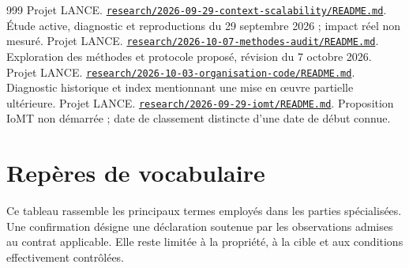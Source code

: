 \documentclass[11pt,a4paper]{article}
\newcommand{\source}[2]{\href{../../#1}{\nolinkurl{#1}}. #2}
\begin{document}
\begin{thebibliography}{999}
 Projet LANCE. \source{research/2026-09-29-context-scalability/README.md}{Étude active, diagnostic et reproductions du 29 septembre 2026 ; impact réel non mesuré.}
 Projet LANCE. \source{research/2026-10-07-methodes-audit/README.md}{Exploration des méthodes et protocole proposé, révision du 7 octobre 2026.}
 Projet LANCE. \source{research/2026-10-03-organisation-code/README.md}{Diagnostic historique et index mentionnant une mise en œuvre partielle ultérieure.}
 Projet LANCE. \source{research/2026-09-29-iomt/README.md}{Proposition IoMT non démarrée ; date de classement distincte d'une date de début connue.}
\end{thebibliography}

\appendix
\section{Repères de vocabulaire}
\label{sec:glossaire}
Ce tableau rassemble les principaux termes employés dans les parties
spécialisées. Une confirmation désigne une déclaration soutenue par les
observations admises au contrat applicable. Elle reste limitée à la propriété,
à la cible et aux conditions effectivement contrôlées.
\small
\end{document}

